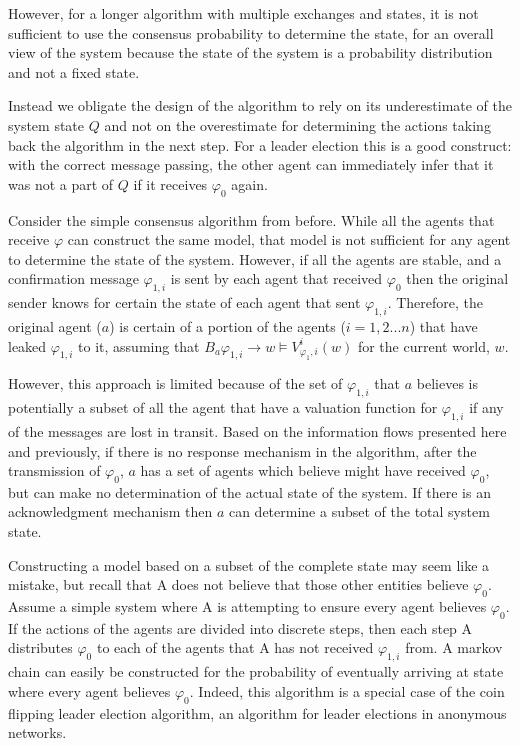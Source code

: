However, for a longer algorithm with multiple exchanges and states, it is not sufficient to use the consensus probability to determine the state, for an overall view of the system because the state of the system is a probability distribution and not a fixed state.

Instead we obligate the design of the algorithm to rely on its underestimate of the system state $Q$ and not on the overestimate for determining the actions taking back the algorithm in the next step. For a leader election this is a good construct: with the correct message passing, the other agent can immediately infer that it was not a part of $Q$ if it receives $\varphi_0$ again. 

Consider the simple consensus algorithm from before. While all the agents that receive $\varphi$ can construct the same model, that model is not sufficient for any agent to determine the state of the system. However, if all the agents are stable, and a confirmation message $\varphi_{1,i}$ is sent by each agent that received $\varphi_0$ then the original sender knows for certain the state of each agent that sent $\varphi_{1,i}$. Therefore, the original agent ($a$) is certain of a portion of the agents ($i=1,2...n$) that have leaked $\varphi_{1,i}$ to it, assuming that $B_a \varphi_{1,i} \rightarrow w \vDash V_{\varphi_1,i}^i(w)$ for the current world, $w$.

However, this approach is limited because of the set of $\varphi_{1,i}$ that $a$ believes is potentially a subset of all the agent that have a valuation function for $\varphi_{1,i}$ if any of the messages are lost in transit. Based on the information flows presented here and previously, if there is no response mechanism in the algorithm, after the transmission of $\varphi_0$, $a$ has a set of agents which believe might have received $\varphi_0$, but can make no determination of the actual state of the system. If there is an acknowledgment mechanism then $a$ can determine a subset of the total system state. 

Constructing a model based on a subset of the complete state may seem like a mistake, but recall that A does not believe that those other entities believe $\varphi_0$. Assume a simple system where A is attempting to ensure every agent believes $\varphi_0$. If the actions of the agents are divided into discrete steps, then each step A distributes $\varphi_0$ to each of the agents that A has not received $\varphi_{1,i}$ from. A markov chain can easily be constructed for the probability of eventually arriving at state where every agent believes $\varphi_0$. Indeed, this algorithm is a special case of the coin flipping leader election algorithm, an algorithm for leader elections in anonymous networks.

